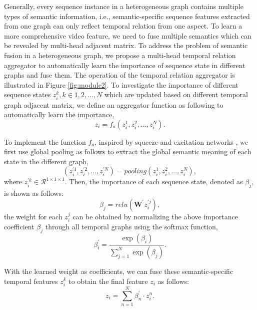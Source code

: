 \documentclass[conference,compsoc]{IEEEtran}
\begin{document}
    Generally, every sequence instance in a heterogeneous graph contains multiple types of semantic information, i.e., semantic-specific sequence features extracted from one graph can only reflect temporal relation from one aspect. To learn a more comprehensive video feature, we need to fuse multiple semantics which can be revealed by multi-head adjacent matrix. To address the problem of semantic fusion in a heterogeneous graph, we propose a multi-head temporal relation aggregator to automatically learn the importance of sequence state in different graphs and fuse them. The operation of the temporal relation aggregator is illustrated in Figure \ref{fig:module2}. 
To investigate the importance of different sequence states $z_{i}^{k}, k \in {1, 2, \ldots, N}$ which are updated based on different temporal graph adjacent matrix, we define an aggregator function as following to automatically learn the importance,
    \begin{equation}
        z_{i} = f_a \left( z_{i}^{1}, z_{i}^{2}, \ldots, z_{i}^{N} \right).
    \end{equation}

    To implement the function $f_a$, inspired by squeeze-and-excitation networks \cite{hu2018squeeze-and-excitation}, we first use global pooling as follows to extract the global semantic meaning of each state in the different graph,
    \begin{equation}
        \left( z_{i}^{\prime 1}, z_{i}^{\prime 2}, \ldots, z_{i}^{\prime N} \right)=pooling\left( z_{i}^{1}, z_{i}^{2}, \ldots, z_{i}^{N} \right),
    \end{equation}
    where $z_{i}^{\prime k} \in \mathcal{R}^{1\times1\times1}$. Then, the importance of each sequence state, denoted as $\beta_j$, is shown as follows:
    \begin{equation}
        \beta_j = relu\left( \mathbf{W^{\prime}}z_{i}^{\prime j} \right),
    \end{equation}
     the weight for each $z_{i}^{j}$ can be obtained by normalizing the above importance coefficient $\beta_{j}$ through all temporal graphs using the softmax function,
     \begin{equation}
         \beta_{i}^{\prime} =  \frac{\exp \left(\beta_{i} \right)}{\sum_{j =1}^{N} \exp \left(\beta_{j}\right)}.
         \label{equ:sem_weight}
     \end{equation}

     With the learned weight as coefficients, we can fuse these semantic-specific temporal features $z_{i}^{k}$ to obtain the final feature $z_{i}$ as follows:
     \begin{equation}
         z_{i} = \sum_{n=1}^{N}\beta_{n}^{\prime} \cdot z_{i}^{n}.
         \label{equ:agg_feature}
     \end{equation}
     
\end{document}
